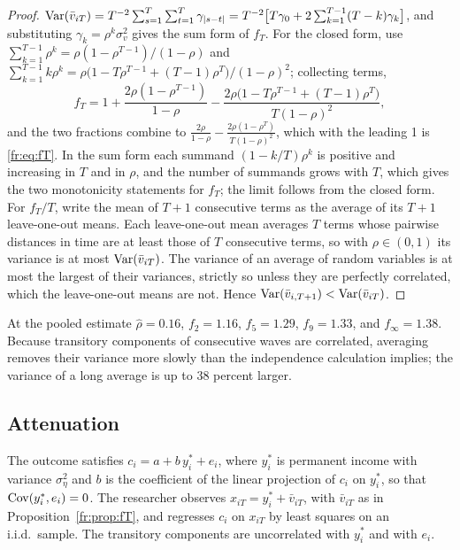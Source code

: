 \begin{proof}
$\mathrm{Var}(\bar v_{iT}) = T^{-2}\sum_{s=1}^{T}\sum_{t=1}^{T}\gamma_{|s-t|}
= T^{-2}\big[T\gamma_0 + 2\sum_{k=1}^{T-1}(T-k)\gamma_k\big]$, and
substituting $\gamma_k = \rho^k\sigma^2_v$ gives the sum form of $f_T$.
For the closed form, use $\sum_{k=1}^{T-1}\rho^k = \rho(1-\rho^{T-1})/(1-\rho)$
and $\sum_{k=1}^{T-1}k\rho^k = \rho\big(1 - T\rho^{T-1} + (T-1)\rho^{T}\big)/(1-\rho)^2$;
collecting terms,
\[
f_T = 1 + \frac{2\rho(1-\rho^{T-1})}{1-\rho} - \frac{2\rho\big(1 - T\rho^{T-1} + (T-1)\rho^{T}\big)}{T(1-\rho)^2},
\]
and the two fractions combine to $\frac{2\rho}{1-\rho} - \frac{2\rho(1-\rho^T)}{T(1-\rho)^2}$,
which with the leading 1 is \eqref{fr:eq:fT}. In the sum form each summand
$(1-k/T)\rho^k$ is positive and increasing in $T$ and in $\rho$, and the
number of summands grows with $T$, which gives the two monotonicity
statements for $f_T$; the limit follows from the closed form. For
$f_T/T$, write the mean of $T+1$ consecutive terms as the average of its
$T+1$ leave-one-out means. Each leave-one-out mean averages $T$ terms
whose pairwise distances in time are at least those of $T$ consecutive
terms, so with $\rho \in (0,1)$ its variance is at most
$\mathrm{Var}(\bar v_{iT})$. The variance of an average of random variables is at
most the largest of their variances, strictly so unless they are
perfectly correlated, which the leave-one-out means are not. Hence
$\mathrm{Var}(\bar v_{i,T+1}) < \mathrm{Var}(\bar v_{iT})$.
\end{proof}

At the pooled estimate $\hat\rho = 0.16$, $f_2 = 1.16$, $f_5 = 1.29$,
$f_9 = 1.33$, and $f_\infty = 1.38$. Because transitory components of consecutive waves are correlated, averaging removes their variance more slowly than the independence calculation implies; the variance of a long average is up to 38 percent larger.

\subsection{Attenuation}

\begin{assumption}
\label{fr:ass:cev}
The outcome satisfies $c_i = a + b\,y^*_i + e_i$, where $y^*_i$ is
permanent income with variance $\sigma^2_\eta$ and $b$ is the coefficient
of the linear projection of $c_i$ on $y^*_i$, so that
$\mathrm{Cov}(y^*_i, e_i) = 0$. The researcher observes
$x_{iT} = y^*_i + \bar v_{iT}$, with $\bar v_{iT}$ as in
Proposition~\ref{fr:prop:fT}, and regresses $c_i$ on $x_{iT}$ by least
squares on an i.i.d.\ sample. The transitory components are uncorrelated
with $y^*_i$ and with $e_i$.
\end{assumption}

